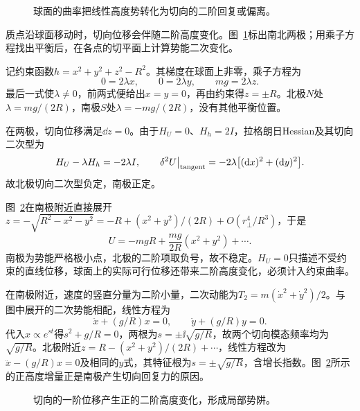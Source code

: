 \begin{figure}[H]\centering
{}
\caption{球面的曲率把线性高度势转化为切向的二阶回复或偏离。}\label{fig:c3-h14-q}
\end{figure}
\begin{solution}
质点沿球面移动时，切向位移会伴随二阶高度变化。图~\ref{fig:c3-h14-q}标出南北两极；用乘子方程找出平衡后，在各点的切平面上计算势能二次变化。


记约束函数$h=x^2+y^2+z^2-R^2$。其梯度在球面上非零，乘子方程为
\[0=2\lambda x,\qquad 0=2\lambda y,\qquad mg=2\lambda z.\]
最后一式使$\lambda\ne0$，前两式便给出$x=y=0$，再由约束得$z=\pm R$。北极$N$处$\lambda=mg/(2R)$，南极$S$处$\lambda=-mg/(2R)$，没有其他平衡位置。

在两极，切向位移满足$\dd z=0$。由于$H_U=0$、$H_h=2I$，拉格朗日Hessian及其切向二次型为
\[H_U-\lambda H_h=-2\lambda I,\qquad
\delta^2U\big|_{\rm tangent}=-2\lambda\bigl[(\mathop{}\!\mathrm d x)^2+(\mathop{}\!\mathrm d y)^2\bigr].\]
故北极切向二次型负定，南极正定。

图~\ref{fig:c3-h14-s}在南极附近直接展开$z=-\sqrt{R^2-x^2-y^2}=-R+(x^2+y^2)/(2R)+O(r_\perp^4/R^3)$，于是
\[U=-mgR+\frac{mg}{2R}(x^2+y^2)+\cdots.
\]
南极为势能严格极小点，北极的二阶项取负号，故不稳定。$H_U=0$只描述不受约束的直线位移，球面上的实际可行位移还带来二阶高度变化，必须计入约束曲率。


在南极附近，速度的竖直分量为二阶小量，二次动能为$T_2=m(\dot x^2+\dot y^2)/2$。与图中展开的二次势能相配，线性方程为
\[\ddot x+(g/R)x=0,\qquad \ddot y+(g/R)y=0.\]
代入$x\propto e^{st}$得$s^2+g/R=0$，两根为$s=\pm\ii\sqrt{g/R}$，故两个切向模态频率均为$\sqrt{g/R}$。北极附近$z=R-(x^2+y^2)/(2R)+\cdots$，线性方程改为$\ddot x-(g/R)x=0$及相同的$y$式，其特征根为$s=\pm\sqrt{g/R}$，含增长指数。图~\ref{fig:c3-h14-s}所示的正高度增量正是南极产生切向回复力的原因。

\begin{figure}[H]\centering
{}
\caption{切向的一阶位移产生正的二阶高度变化，形成局部势阱。}\label{fig:c3-h14-s}
\end{figure}
\end{solution}

